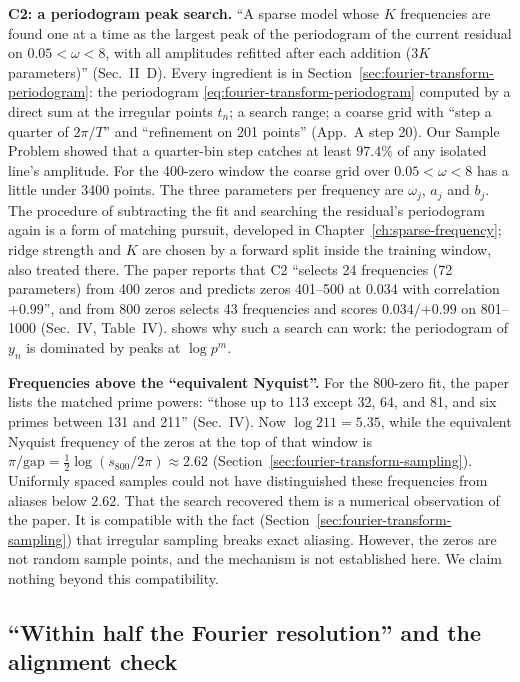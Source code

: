 \textbf{C2: a periodogram peak search.} ``A sparse model whose $K$ frequencies are found one at a time as the largest peak of the periodogram of the current residual on $0.05<\omega<8$, with all amplitudes refitted after each addition ($3K$ parameters)'' (Sec.~II~D). Every ingredient is in Section~\ref{sec:fourier-transform-periodogram}: the periodogram \eqref{eq:fourier-transform-periodogram} computed by a direct sum at the irregular points $t_n$; a search range; a coarse grid with ``step a quarter of $2\pi/T$'' and ``refinement on 201 points'' (App.~A step 20). Our Sample Problem showed that a quarter-bin step catches at least $97.4\%$ of any isolated line's amplitude. For the 400-zero window the coarse grid over $0.05<\omega<8$ has a little under 3400 points. The three parameters per frequency are $\omega_j$, $a_j$ and $b_j$. The procedure of subtracting the fit and searching the residual's periodogram again is a form of matching pursuit, developed in Chapter~\ref{ch:sparse-frequency}; ridge strength and $K$ are chosen by a forward split inside the training window, also treated there. The paper reports that C2 ``selects 24 frequencies (72 parameters) from 400 zeros and predicts zeros 401--500 at $0.034$ with correlation $+0.99$'', and from 800 zeros selects 43 frequencies and scores $0.034/{+0.99}$ on 801--1000 (Sec.~IV, Table~IV).  shows why such a search can work: the periodogram of $y_n$ is dominated by peaks at $\log p^m$.

\textbf{Frequencies above the ``equivalent Nyquist''.} For the 800-zero fit, the paper lists the matched prime powers: ``those up to 113 except 32, 64, and 81, and six primes between 131 and 211'' (Sec.~IV). Now $\log211=5.35$, while the equivalent Nyquist frequency of the zeros at the top of that window is $\pi/\mathrm{gap}=\frac12\log(s_{800}/2\pi)\approx2.62$ (Section~\ref{sec:fourier-transform-sampling}). Uniformly spaced samples could not have distinguished these frequencies from aliases below $2.62$. That the search recovered them is a numerical observation of the paper. It is compatible with the fact (Section~\ref{sec:fourier-transform-sampling}) that irregular sampling breaks exact aliasing. However, the zeros are not random sample points, and the mechanism is not established here. We claim nothing beyond this compatibility.

\subsection{``Within half the Fourier resolution'' and the alignment check}

